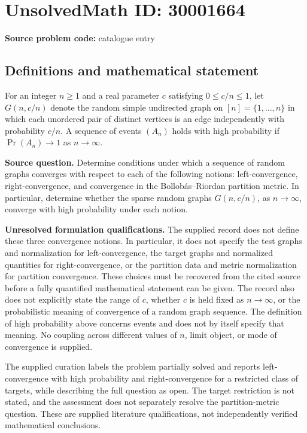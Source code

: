 \documentclass[11pt]{article}
\begin{document}
\section*{UnsolvedMath ID: 30001664}
\textbf{Source problem code:} catalogue entry
\subsection{Definitions and mathematical statement}
For an integer \(n\geq 1\) and a real parameter \(c\) satisfying \(0\leq c/n\leq 1\), let \(G(n,c/n)\) denote the random simple undirected graph on \([n]=\{1,\ldots,n\}\) in which each unordered pair of distinct vertices is an edge independently with probability \(c/n\). A sequence of events \((A_n)\) holds with high probability if \(\Pr(A_n)\to 1\) as \(n\to\infty\).

\textbf{Source question.} Determine conditions under which a sequence of random graphs converges with respect to each of the following notions: left-convergence, right-convergence, and convergence in the Bollob\'as--Riordan partition metric. In particular, determine whether the sparse random graphs \(G(n,c/n)\), as \(n\to\infty\), converge with high probability under each notion.

\textbf{Unresolved formulation qualifications.} The supplied record does not define these three convergence notions. In particular, it does not specify the test graphs and normalization for left-convergence, the target graphs and normalized quantities for right-convergence, or the partition data and metric normalization for partition convergence. These choices must be recovered from the cited source before a fully quantified mathematical statement can be given. The record also does not explicitly state the range of \(c\), whether \(c\) is held fixed as \(n\to\infty\), or the probabilistic meaning of convergence of a random graph sequence. The definition of high probability above concerns events and does not by itself specify that meaning. No coupling across different values of \(n\), limit object, or mode of convergence is supplied.

The supplied curation labels the problem partially solved and reports left-convergence with high probability and right-convergence for a restricted class of targets, while describing the full question as open. The target restriction is not stated, and the assessment does not separately resolve the partition-metric question. These are supplied literature qualifications, not independently verified mathematical conclusions.
\end{document}
